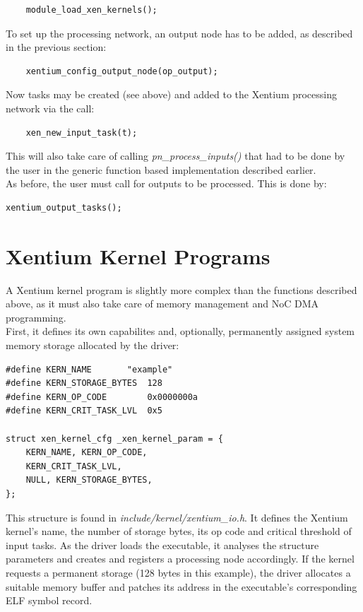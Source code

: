 \begin{lstlisting}
	module_load_xen_kernels();
\end{lstlisting}

\noindent
To set up the processing network, an output node has to be added, as described
in the previous section:

\begin{lstlisting}
	xentium_config_output_node(op_output);
\end{lstlisting}

\noindent
Now tasks may be created (see above) and added to the Xentium processing network
via the call:

\begin{lstlisting}
	xen_new_input_task(t);
\end{lstlisting}

\noindent
This will also take care of calling \emph{pn\_process\_inputs()} that had
to be done by the user in the generic function based implementation described
earlier.
\\


\noindent
As before, the user must call for outputs to be processed. This is done by:

\begin{lstlisting}
xentium_output_tasks();
\end{lstlisting}


\section{Xentium Kernel Programs}

A Xentium kernel program is slightly more complex than the functions described
above, as it must also take care of memory management and NoC DMA programming.
\\

\noindent
First, it defines its own capabilites and, optionally, permanently assigned
system memory storage allocated by the driver:

\begin{lstlisting}
#define KERN_NAME		"example"
#define KERN_STORAGE_BYTES	128
#define KERN_OP_CODE		0x0000000a
#define KERN_CRIT_TASK_LVL	0x5

struct xen_kernel_cfg _xen_kernel_param = {
	KERN_NAME, KERN_OP_CODE,
	KERN_CRIT_TASK_LVL,
	NULL, KERN_STORAGE_BYTES,
};

\end{lstlisting}

\noindent
This structure is found in \emph{include/kernel/xentium\_io.h}. It defines
the Xentium kernel's name, the number of storage bytes, its op code and critical
threshold of input tasks. As the driver loads the executable, it analyses the
structure parameters and creates and registers a processing node accordingly.
If the kernel requests a permanent storage (128 bytes in this example), the
driver allocates a suitable memory buffer and patches its address in the
executable's corresponding ELF symbol record.
\\

